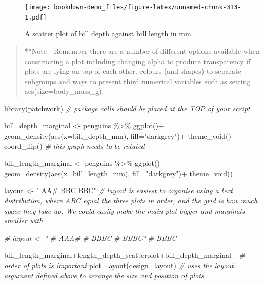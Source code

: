 \documentclass[
]{book}
\newenvironment{Shaded}{\begin{snugshade}}{\end{snugshade}}
\newcommand{\AttributeTok}[1]{\textcolor[rgb]{0.77,0.63,0.00}{#1}}
\newcommand{\CommentTok}[1]{\textcolor[rgb]{0.56,0.35,0.01}{\textit{#1}}}
\newcommand{\FunctionTok}[1]{\textcolor[rgb]{0.00,0.00,0.00}{#1}}
\newcommand{\NormalTok}[1]{#1}
\newcommand{\OtherTok}[1]{\textcolor[rgb]{0.56,0.35,0.01}{#1}}
\newcommand{\SpecialCharTok}[1]{\textcolor[rgb]{0.00,0.00,0.00}{#1}}
\newcommand{\StringTok}[1]{\textcolor[rgb]{0.31,0.60,0.02}{#1}}
\begin{document}
\begin{figure}
\centering
\texttt{[image: bookdown-demo\_files/figure-latex/unnamed-chunk-313-1.pdf]}
\caption{\label{fig:unnamed-chunk-313}A scatter plot of bill depth against bill length in mm}
\end{figure}

\begin{quote}
**Note - Remember there are a number of different options available when constructing a plot including changing alpha to produce transparency if plots are lying on top of each other, colours (and shapes) to separate subgroups and ways to present third numerical variables such as setting aes(size=body\_mass\_g).
\end{quote}

\begin{Shaded}
\begin{Highlighting}[]
\FunctionTok{library}\NormalTok{(patchwork) }\CommentTok{\# package calls should be placed at the TOP of your script}

\NormalTok{bill\_depth\_marginal }\OtherTok{\textless{}{-}}\NormalTok{ penguins }\SpecialCharTok{\%\textgreater{}\%} 
  \FunctionTok{ggplot}\NormalTok{()}\SpecialCharTok{+}
  \FunctionTok{geom\_density}\NormalTok{(}\FunctionTok{aes}\NormalTok{(}\AttributeTok{x=}\NormalTok{bill\_depth\_mm), }\AttributeTok{fill=}\StringTok{"darkgrey"}\NormalTok{)}\SpecialCharTok{+}
  \FunctionTok{theme\_void}\NormalTok{()}\SpecialCharTok{+}
  \FunctionTok{coord\_flip}\NormalTok{() }\CommentTok{\# this graph needs to be rotated}

\NormalTok{bill\_length\_marginal }\OtherTok{\textless{}{-}}\NormalTok{ penguins }\SpecialCharTok{\%\textgreater{}\%} 
  \FunctionTok{ggplot}\NormalTok{()}\SpecialCharTok{+}
  \FunctionTok{geom\_density}\NormalTok{(}\FunctionTok{aes}\NormalTok{(}\AttributeTok{x=}\NormalTok{bill\_length\_mm), }\AttributeTok{fill=}\StringTok{"darkgrey"}\NormalTok{)}\SpecialCharTok{+}
  \FunctionTok{theme\_void}\NormalTok{()}

\NormalTok{layout }\OtherTok{\textless{}{-}} \StringTok{"}
\StringTok{AA\#}
\StringTok{BBC}
\StringTok{BBC"}
\CommentTok{\# layout is easiest to organise using a text distribution, where ABC equal the three plots in order, and the grid is how much space they take up. We could easily make the main plot bigger and marginals smaller with}

\CommentTok{\# layout \textless{}{-} "}
\CommentTok{\# AAA\#}
\CommentTok{\# BBBC}
\CommentTok{\# BBBC"}
\CommentTok{\# BBBC}

\NormalTok{bill\_length\_marginal}\SpecialCharTok{+}\NormalTok{length\_depth\_scatterplot}\SpecialCharTok{+}\NormalTok{bill\_depth\_marginal}\SpecialCharTok{+} \CommentTok{\# order of plots is important}
  \FunctionTok{plot\_layout}\NormalTok{(}\AttributeTok{design=}\NormalTok{layout) }\CommentTok{\# uses the layout argument defined above to arrange the size and position of plots}
\end{Highlighting}
\end{Shaded}
\end{document}
